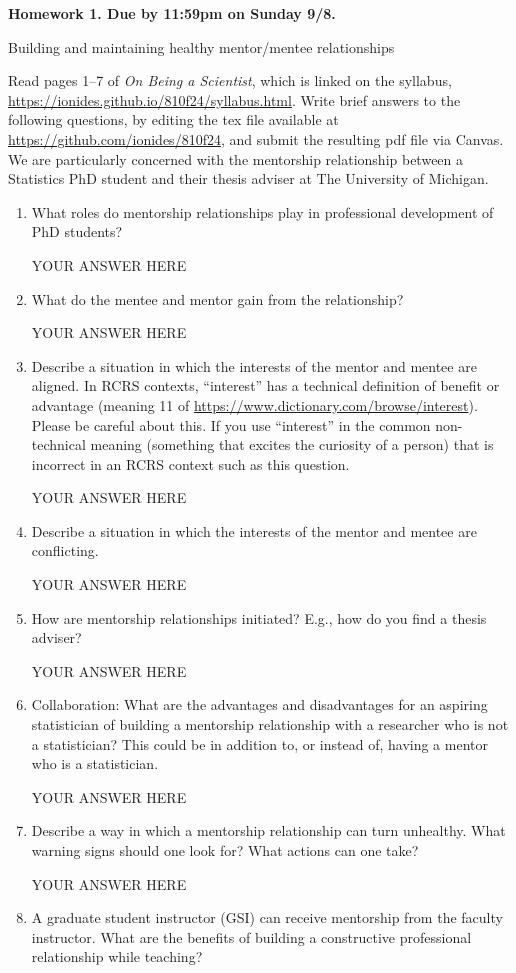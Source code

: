\documentclass[12pt]{article}
\begin{document}
\begin{center}{\bf
Homework 1. Due by 11:59pm on Sunday 9/8.

Building and maintaining healthy mentor/mentee relationships
}\end{center}

Read pages 1--7 of {\em On Being a Scientist}, which is linked on the syllabus, \url{https://ionides.github.io/810f24/syllabus.html}. Write brief answers to the following questions, by editing the tex file available at \url{https://github.com/ionides/810f24}, and submit the resulting pdf file via Canvas. We are particularly concerned with the mentorship relationship between a Statistics PhD student and their thesis adviser at The University of Michigan.

\begin{enumerate}
\item What roles do mentorship relationships play in professional development of PhD students? 

YOUR ANSWER HERE

\item What do the mentee and mentor gain from the relationship?

YOUR ANSWER HERE

\item Describe a situation in which the interests of the mentor and mentee are aligned. In RCRS contexts, ``interest'' has a technical definition of benefit or advantage (meaning 11 of \url{https://www.dictionary.com/browse/interest}). Please be careful about this. If you use ``interest'' in the common non-technical meaning (something that excites the curiosity of a person) that is incorrect in an RCRS context such as this question.

YOUR ANSWER HERE

\item Describe a situation in which the interests of the mentor and mentee are conflicting. 

YOUR ANSWER HERE

\item How are mentorship relationships initiated? E.g., how do you find a thesis adviser?

YOUR ANSWER HERE

\item Collaboration: What are the advantages and disadvantages for an aspiring statistician of building a mentorship relationship with a researcher who is not a statistician? This could be in addition to, or instead of, having a mentor who is a statistician.

YOUR ANSWER HERE

\item Describe a way in which a mentorship relationship can turn unhealthy. What warning signs should one look for? What actions can one take?

YOUR ANSWER HERE

\item A graduate student instructor (GSI) can receive mentorship from the faculty instructor. What are the benefits of building a constructive professional relationship while teaching?
  
\end{enumerate}
\end{document}
